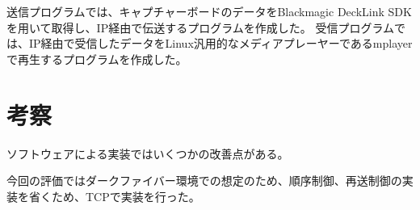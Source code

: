 送信プログラムでは、キャプチャーボードのデータをBlackmagic DeckLink SDK\cite{bmd-decklink-sdk}を用いて取得し、IP経由で伝送するプログラムを作成した。
受信プログラムでは、IP経由で受信したデータをLinux汎用的なメディアプレーヤーであるmplayerで再生するプログラムを作成した\cite{bmd-4k-streaming}。

\section{考察}

ソフトウェアによる実装ではいくつかの改善点がある。

今回の評価ではダークファイバー環境での想定のため、順序制御、再送制御の実装を省くため、TCPで実装を行った。


